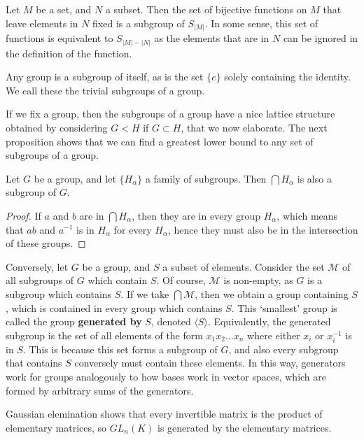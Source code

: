 \begin{example}
    Let $M$ be a set, and $N$ a subset. Then the set of bijective functions on $M$ that leave elements in $N$ fixed is a subgroup of $S_{|M|}$. In some sense, this set of functions is equivalent to $S_{|M| - |N|}$ as the elements that are in $N$ can be ignored in the definition of the function.
\end{example}

\begin{example}
    Any group is a subgroup of itself, as is the set $\{ e \}$ solely containing the identity. We call these the trivial subgroups of a group.
\end{example}

If we fix a group, then the subgroups of a group have a nice lattice structure obtained by considering $G < H$ if $G \subset H$, that we now elaborate. The next proposition shows that we can find a greatest lower bound to any set of subgroups of a group.

\begin{prop}
    Let $G$ be a group, and let $\{ H_\alpha \}$ a family of subgroups. Then $\bigcap H_\alpha$ is also a subgroup of $G$.
\end{prop}
\begin{proof}
    If $a$ and $b$ are in $\bigcap H_\alpha$, then they are in every group $H_\alpha$, which means that $ab$ and $a^{-1}$ is in $H_\alpha$ for every $H_\alpha$, hence they must also be in the intersection of these groups.
\end{proof}

Conversely, let $G$ be a group, and $S$ a subset of elements. Consider the set $\mathcal{M}$ of all subgroups of $G$ which contain $S$. Of course, $\mathcal{M}$ is non-empty, as $G$ is a subgroup which contains $S$. If we take $\bigcap \mathcal{M}$, then we obtain a group containing $S$, which is contained in every group which contains $S$. This `smallest' group is called the group {\bf generated by} $S$, denoted $\langle S \rangle$. Equivalently, the generated subgroup is the set of all elements of the form $x_1 x_2 \dots x_n$ where either $x_i$ or $x_i^{-1}$ is in $S$. This is because this set forms a subgroup of $G$, and also every subgroup that contains $S$ conversely must contain these elements. In this way, generators work for groups analogously to how bases work in vector spaces, which are formed by arbitrary sums of the generators.

\begin{example}
    Gaussian elemination shows that every invertible matrix is the product of elementary matrices, so $GL_n(K)$ is generated by the elementary matrices.
\end{example}

